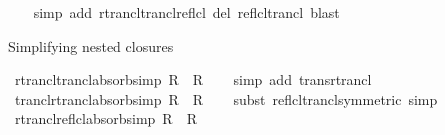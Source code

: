 \begin{isabellebody}
\ \ \isamarkupfalse%
\ {\isacharparenleft}{\kern0pt}simp\ add{\isacharcolon}{\kern0pt}\ rtrancl{\isacharunderscore}{\kern0pt}trancl{\isacharunderscore}{\kern0pt}reflcl\ del{\isacharcolon}{\kern0pt}\ reflcl{\isacharunderscore}{\kern0pt}trancl{\isacharparenright}{\kern0pt}\ blast%
\endisatagproof
{\isafoldproof}%
%
\isadelimproof
%
\endisadelimproof
%
\begin{isamarkuptext}%
Simplifying nested closures%
\end{isamarkuptext}\isamarkuptrue%
\isamarkupfalse%
\ rtrancl{\isacharunderscore}{\kern0pt}trancl{\isacharunderscore}{\kern0pt}absorb{\isacharbrackleft}{\kern0pt}simp{\isacharbrackright}{\kern0pt}{\isacharcolon}{\kern0pt}\ {\isachardoublequoteopen}{\isacharparenleft}{\kern0pt}R\isactrlsup {\isacharasterisk}{\kern0pt}{\isacharparenright}{\kern0pt}\isactrlsup {\isacharplus}{\kern0pt}\ {\isacharequal}{\kern0pt}\ R\isactrlsup {\isacharasterisk}{\kern0pt}{\isachardoublequoteclose}\isanewline
%
\isadelimproof
\ \ %
\endisadelimproof
%
\isatagproof
{}\isamarkupfalse%
\ {\isacharparenleft}{\kern0pt}simp\ add{\isacharcolon}{\kern0pt}\ trans{\isacharunderscore}{\kern0pt}rtrancl{\isacharparenright}{\kern0pt}%
\endisatagproof
{\isafoldproof}%
%
\isadelimproof
\isanewline
%
\endisadelimproof
\isanewline
{}\isamarkupfalse%
\ trancl{\isacharunderscore}{\kern0pt}rtrancl{\isacharunderscore}{\kern0pt}absorb{\isacharbrackleft}{\kern0pt}simp{\isacharbrackright}{\kern0pt}{\isacharcolon}{\kern0pt}\ {\isachardoublequoteopen}{\isacharparenleft}{\kern0pt}R\isactrlsup {\isacharplus}{\kern0pt}{\isacharparenright}{\kern0pt}\isactrlsup {\isacharasterisk}{\kern0pt}\ {\isacharequal}{\kern0pt}\ R\isactrlsup {\isacharasterisk}{\kern0pt}{\isachardoublequoteclose}\isanewline
%
\isadelimproof
\ \ %
\endisadelimproof
%
\isatagproof
{}\isamarkupfalse%
\ {\isacharparenleft}{\kern0pt}subst\ reflcl{\isacharunderscore}{\kern0pt}trancl{\isacharbrackleft}{\kern0pt}symmetric{\isacharbrackright}{\kern0pt}{\isacharparenright}{\kern0pt}\ simp%
\endisatagproof
{\isafoldproof}%
%
\isadelimproof
\isanewline
%
\endisadelimproof
\isanewline
{}\isamarkupfalse%
\ rtrancl{\isacharunderscore}{\kern0pt}reflcl{\isacharunderscore}{\kern0pt}absorb{\isacharbrackleft}{\kern0pt}simp{\isacharbrackright}{\kern0pt}{\isacharcolon}{\kern0pt}\ {\isachardoublequoteopen}{\isacharparenleft}{\kern0pt}R\isactrlsup {\isacharasterisk}{\kern0pt}{\isacharparenright}{\kern0pt}\isactrlsup {\isacharequal}{\kern0pt}\ {\isacharequal}{\kern0pt}\ R\isactrlsup {\isacharasterisk}{\kern0pt}{\isachardoublequoteclose}\isanewline

\end{isabellebody}
